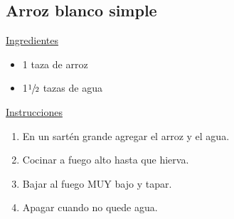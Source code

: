 \subsection{Arroz blanco simple}
\underline{Ingredientes}
\begin{itemize}
\item 1 taza de arroz
\item 1$\sfrac{1}{2}$ tazas de agua
\end{itemize}

\underline{Instrucciones}
\begin{enumerate}
\item En un sartén grande agregar el arroz y el agua.
\item Cocinar a fuego alto hasta que hierva.
\item Bajar al fuego MUY bajo y tapar.
\item Apagar cuando no quede agua.
\end{enumerate}

